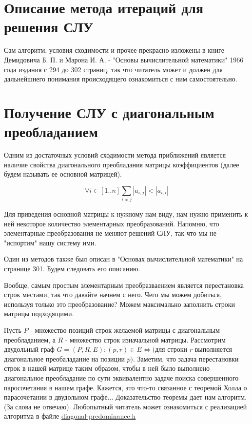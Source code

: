 \documentclass{article}
\begin{document}
\section{Описание метода итераций для решения СЛУ}
Сам алгоритм, условия сходимости и прочее прекрасно изложены
в книге Демидовича Б. П. и Марона И. А.
- "Основы вычислительной математики" 1966 года издания с
294 до 302 страниц, так что читатель может и должен для
дальнейшнего понимания происходящего ознакомиться с ним
самостоятельно.

\section{Получение СЛУ с диагональным преобладанием}
Одним из достаточных условий сходимости метода приближений является
наличие свойства диагонального преобладания матрицы коэффициентов
(далее будем называть ее основной матрицей).

\begin{equation}
    \forall i \in [1..n] \sum_{i \neq j} |a_{i, j}| < |a_{i,i}|
\end{equation}

Для приведения основной матрицы к нужному нам виду, нам
нужно применить к ней некоторое количество элементарных
преобразований. Напомню, что элементарные преобразования не
меняют решений СЛУ, так что мы не "испортим" нашу систему ими.

Один из методов также был описан в
"Основах вычислительной математики" на странице 301.
Будем следовать его описанию.

Вообще, самым простым элементарным преобразваением является
перестановка строк местами, так что давайте начнем с него.
Чего мы можем добиться, используя только это преобразование?
Можем максимально заполнить строки матрицы подходящими.

Пусть $P$ - множество позиций строк желаемой матрицы с
диагональным преобладанием, а $R$ - множество
строк изначальной матрицы.
Рассмотрим двудольный граф $G = (P, R, E): (p, r) \in E
    \Leftrightarrow ($для строки $r$ выполняется диагональное
    преобаладание на позиции $p)$. Заметим, что задача перестановки
строк в нашей матрице таким образом, чтобы в ней было выполнено
диагональное преобладание по сути эквивалентно задаче
поиска совершенного паросочетания в нашем графе.
Кажется, это что-то связанное с теоремой Холла о парасочетании
в двудольном графе... Доказательство теоремы дает нам алгоритм.
(За слова не отвечаю). Любопытный читатель может ознакомиться с реализацией
алгоритма в файле \href{https://github.com/vityaman-edu/comp-math-systems-of-linear-equations/blob/trunk/app/sle/include/method/iteration/diagonal-predominance.h}{diagonal-predominance.h}
\end{document}
